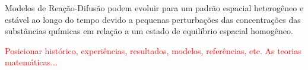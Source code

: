 Modelos de Reação-Difusão podem evoluir para um padrão
espacial heterogêneo e estável ao longo do tempo devido a pequenas perturbações das
concentrações das substâncias químicas em relação a um estado de equilíbrio espacial
homogêneo.\par
\textcolor{red}{Posicionar histórico, experiências, resultados, modelos, referências, etc. As teorias matemáticas...}
